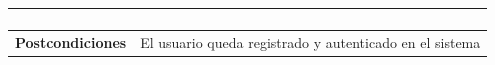 \begin{longtable}{| p{4cm} | p{10cm} |}
\begin{enumerate}[leftmargin=0.9cm, topsep=0.1cm]
\end{enumerate}\\

\hline
\textbf{Postcondiciones} & 
El usuario queda registrado y autenticado en el sistema\\
\hline
\end{longtable}